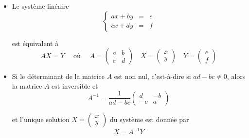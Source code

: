 \begin{frame}

\hfill{}

\begin{itemize}
  \item Le système linéaire
$$
\left\{\begin{array}{rcl} 
a x + b y & = & e\\
c x + d y & = & f 
\end{array}\right.  
$$

\pause
est équivalent à
$$AX = Y \quad \text{ où } \quad A = \begin{pmatrix} a & b \\ c & d \end{pmatrix} 
\quad  X = \begin{pmatrix} x \\ y \end{pmatrix} \quad Y = \begin{pmatrix} e \\ f \end{pmatrix}$$

\pause

  \item Si le déterminant de la matrice $A$ est non nul, c'est-à-dire si $ad-bc \neq 0$, 
alors la matrice $A$ est inversible et
$$A^{-1} = \frac{1}{ad-bc} \begin{pmatrix} d & -b \\ -c & a \end{pmatrix}$$

\pause


et l'unique solution $X=\left( \begin{smallmatrix} x \\ y \end{smallmatrix}\right)$
du système est donnée par 
$$X = A^{-1} Y$$
\end{itemize}

\end{frame}


